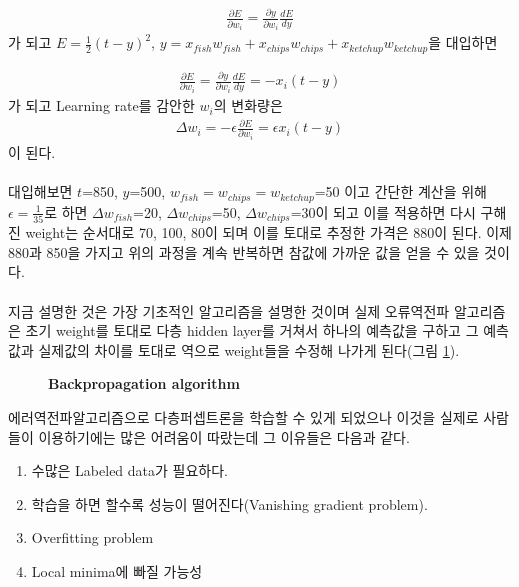 \documentclass[10pt]{article}
\begin{document}
\begin{align}
\frac{\partial E}{\partial w_i}= \frac{\partial y}{\partial w_i} \frac{dE}{dy}
\end{align}
가 되고 $E=\frac{1}{2}(t-y)^2$, $y=x_{fish}w_{fish} + x_{chips}w_{chips} + x_{ketchup}w_{ketchup}$을 대입하면 


\begin{align}
\frac{\partial E}{\partial w_i}= \frac{\partial y}{\partial w_i} \frac{dE}{dy}= - x_i(t-y)
\end{align}
가 되고 Learning rate를 감안한 $w_i$의 변화량은 
\begin{align}
\Delta w_i= -\epsilon \frac{\partial E}{\partial w_i}= \epsilon x_i(t-y)
\end{align}
이 된다. \\\\

대입해보면 $t$=850, $y$=500, $w_{fish}=w_{chips}=w_{ketchup}$=50 이고 간단한 계산을 위해 $\epsilon=\frac{1}{35}$로 하면 $\Delta w_{fish}$=20, $\Delta w_{chips}$=50, $\Delta w_{chips}$=30이 되고 이를 적용하면 다시 구해진 weight는 순서대로 70, 100, 80이 되며 이를 토대로 추정한 가격은 880이 된다. 이제 880과 850을 가지고 위의 과정을 계속 반복하면 참값에 가까운 값을 얻을 수 있을 것이다. \\\\

지금 설명한 것은 가장 기초적인 알고리즘을 설명한 것이며 실제 오류역전파 알고리즘은 초기 weight를 토대로 다층 hidden layer를 거쳐서 하나의 예측값을 구하고 그 예측값과 실제값의 차이를 토대로 역으로 weight들을 수정해 나가게 된다(그림 \ref{forback})\cite{kimjunmoppt}. 

\begin{figure}
\caption{\bf{Backpropagation algorithm}}
\label{forback}
\end{figure}

에러역전파알고리즘으로 다층퍼셉트론을 학습할 수 있게 되었으나 이것을 실제로 사람들이 이용하기에는 많은 어려움이 따랐는데 그 이유들은 다음과 같다.
\begin{enumerate}
\item 수많은 Labeled data가 필요하다.
\item 학습을 하면 할수록 성능이 떨어진다(Vanishing gradient problem).
\item Overfitting problem 
\item Local minima에 빠질 가능성
\end{enumerate} 
\end{document}
